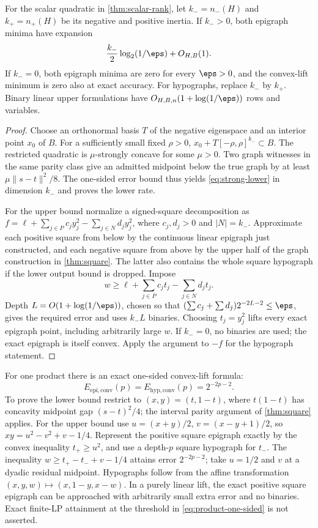 \begin{theorem}\label{thm:inertia}
For the scalar quadratic in \cref{thm:scalar-rank}, let
$k_-=n_-(H)$ and $k_+=n_+(H)$ be its negative and positive inertia.
If $k_->0$, both epigraph minima have expansion
\[
 \frac{k_-}{2}\log_2(1/\eps)+O_{H,B}(1).
\]
If $k_-=0$, both epigraph minima are zero for every $\eps>0$, and the
convex-lift minimum is zero also at exact accuracy. For hypographs,
replace $k_-$ by $k_+$. Binary linear upper formulations have
$O_{H,B,n}(1+\log(1/\eps))$ rows and variables.
\end{theorem}
\begin{proof}
Choose an orthonormal basis $T$ of the negative eigenspace and an
interior point $x_0$ of $B$. For a sufficiently small fixed $\rho>0$,
$x_0+T[-\rho,\rho]^{k_-}\subset B$. The restricted quadratic is
$\mu$-strongly concave for some $\mu>0$. Two graph witnesses in the
same parity class give an admitted midpoint below the true graph by
at least $\mu\|s-t\|^2/8$. The one-sided error bound thus yields
\eqref{eq:strong-lower} in dimension $k_-$ and proves the lower rate.

For the upper bound normalize a signed-square decomposition as
$f=\ell+\sum_{j\in P}c_jy_j^2-\sum_{j\in N}d_jy_j^2$,
where $c_j,d_j>0$ and $|N|=k_-$. Approximate each positive square
from below by the continuous linear epigraph just constructed, and
each negative square from above by the upper half of the graph
construction in \cref{thm:square}. The latter also contains the whole
square hypograph if the lower output bound is dropped. Impose
\[
 w\ge\ell+\sum_{j\in P}c_jt_j-\sum_{j\in N}d_jt_j.
\]
Depth $L=O(1+\log(1/\eps))$, chosen so that
$(\sum c_j+\sum d_j)2^{-2L-2}\le\eps$, gives the required error and
uses $k_-L$ binaries. Choosing $t_j=y_j^2$ lifts every exact epigraph
point, including arbitrarily large $w$. If $k_-=0$, no binaries are
used; the exact epigraph is itself convex. Apply the argument to $-f$
for the hypograph statement.
\end{proof}

For one product there is an exact one-sided convex-lift formula:
\begin{equation}\label{eq:product-one-sided}
 E_{\mathrm{epi,conv}}(p)=E_{\mathrm{hyp,conv}}(p)=2^{-2p-2}.
\end{equation}
To prove the lower bound restrict to $(x,y)=(t,1-t)$, where
$t(1-t)$ has concavity midpoint gap $(s-t)^2/4$; the interval parity
argument of \cref{thm:square} applies. For the upper bound use
$u=(x+y)/2$, $v=(x-y+1)/2$, so
$xy=u^2-v^2+v-1/4$. Represent the positive square epigraph exactly by
the convex inequality $t_+\ge u^2$, and use a depth-$p$ square
hypograph for $t_-$. The inequality
$w\ge t_+-t_-+v-1/4$ attains error $2^{-2p-2}$; take $u=1/2$ and
$v$ at a dyadic residual midpoint. Hypographs follow from the affine
transformation $(x,y,w)\mapsto(x,1-y,x-w)$. In a purely linear lift,
the exact positive square epigraph can be approached with arbitrarily
small extra error and no binaries. Exact finite-LP attainment at the
threshold in \eqref{eq:product-one-sided} is not asserted.

